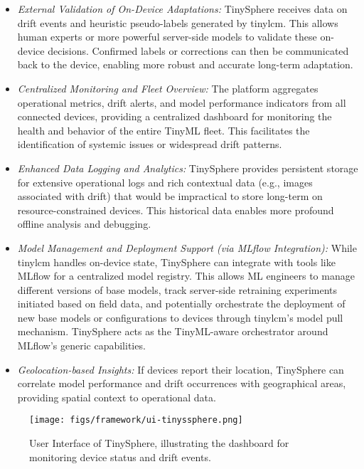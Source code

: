 \begin{itemize}
    \item \textit{External Validation of On-Device Adaptations:} TinySphere receives data on drift events and heuristic pseudo-labels generated by \gls{tinylcm}. This allows human experts or more powerful server-side models to validate these on-device decisions. Confirmed labels or corrections can then be communicated back to the device, enabling more robust and accurate long-term adaptation.
    \item \textit{Centralized Monitoring and Fleet Overview:} The platform aggregates operational metrics, drift alerts, and model performance indicators from all connected devices, providing a centralized dashboard for monitoring the health and behavior of the entire TinyML fleet. This facilitates the identification of systemic issues or widespread drift patterns.
    \item \textit{Enhanced Data Logging and Analytics:} TinySphere provides persistent storage for extensive operational logs and rich contextual data (e.g., images associated with drift) that would be impractical to store long-term on resource-constrained devices. This historical data enables more profound offline analysis and debugging.
    \item \textit{Model Management and Deployment Support (via MLflow Integration):} While \gls{tinylcm} handles on-device state, TinySphere can integrate with tools like MLflow for a centralized model registry. This allows ML engineers to manage different versions of base models, track server-side retraining experiments initiated based on field data, and potentially orchestrate the deployment of new base models or configurations to devices through \gls{tinylcm}'s model pull mechanism. TinySphere acts as the TinyML-aware orchestrator around MLflow's generic capabilities.
    \item \textit{Geolocation-based Insights:} If devices report their location, TinySphere can correlate model performance and drift occurrences with geographical areas, providing spatial context to operational data.
\end{itemize}

\begin{figure}[htbp]
    \centering
    \texttt{[image: figs/framework/ui-tinyssphere.png]}
    \caption[User Interface of TinySphere]{User Interface of TinySphere, illustrating the dashboard for monitoring device status and drift events.}
    \label{fig:uitinysphere}
\end{figure}

